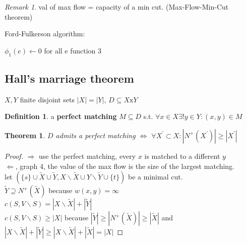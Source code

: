 \documentclass{article}
\newtheorem*{theorem}{Theorem}
\theoremstyle{definition}
\newtheorem*{definition}{Definition}
\theoremstyle{remark}
\newtheorem*{remark}{Remark}
\begin{document}
\begin{remark}
  val of max flow = capacity of a min cut. (Max-Flow-Min-Cut theorem)
\end{remark}
\begin{algorithm}
  Ford-Fulkerson algorithm: 
  \begin{algorithmic}
  \State $\phi_1(e) \gets 0$ for all e
     \State function 3
  \EndWhile
  \end{algorithmic}
\end{algorithm}
\subsection*{Hall's marriage theorem}
$X,Y$ finite disjoint sets $|X|=|Y|$, $D\subseteq X \text{x} Y$
\begin{definition}
  a \textbf{perfect matching} $M\subseteq D$ s.t. $\forall x\in X \exists ! y\in Y: (x,y) \in M$
\end{definition}
\begin{theorem}
  $D$ admits a perfect matching $\Longleftrightarrow$ $\forall X^\prime \subset X: |N^+(X^\prime)| \geq |X^\prime|$
\end{theorem}
\begin{proof}
  $\Rightarrow$ use the perfect matching, every $x$ is matched to a different $y$\\
  $\Leftarrow$, graph 4, the value of the max flow is the size of the largest matching.\\
  let $(\{s\}\cup \widetilde{X} \cup \widetilde{Y}, X \backslash \widetilde{X} \cup Y \backslash \widetilde{Y} \cup \{t\})$ be a minimal cut.\\
  $\widetilde{Y} \supseteq N^+(\widetilde{X})$ because $w(x,y) = \infty$\\
  $c(S, V\backslash S) = |X\backslash \widetilde{X}| + |\widetilde{Y}|$\\
  $c(S, V\backslash S) \geq |X|$ because $|\widetilde{Y}| \geq |N^+(\widetilde{X})| \geq |\widetilde{X}|$ and $|X\backslash \widetilde{X}|+|\widetilde{Y}| \geq |X\backslash \widetilde{X}|+ |\widetilde{X}| = |X|$
\end{proof}
\end{document}
